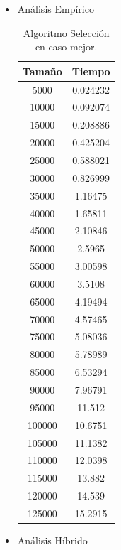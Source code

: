 \documentclass[a4paper,12pt,twoside]{article} %
\begin{document}
	\begin{itemize}
	\item Análisis Empírico
	
	\begin{table}[h]
	\begin{center}
		\begin{tabular}{|c|c|}
		\hline
		Tamaño & Tiempo \\
		\hline
		5000 & 0.024232 \\
		10000 & 0.092074 \\
		15000 & 0.208886 \\
		20000 & 0.425204 \\
		25000 & 0.588021 \\
		30000 & 0.826999 \\
		35000 & 1.16475 \\
		40000 & 1.65811 \\
		45000 & 2.10846 \\
		50000 & 2.5965 \\
		55000 & 3.00598 \\
		60000 & 3.5108 \\
		65000 & 4.19494 \\
		70000 & 4.57465 \\
		75000 & 5.08036 \\
		80000 & 5.78989 \\
		85000 & 6.53294 \\
		90000 & 7.96791 \\
		95000 & 11.512 \\
		100000 & 10.6751 \\
		105000 & 11.1382 \\
		110000 & 12.0398 \\
		115000 & 13.882 \\
		120000 & 14.539 \\
		125000 & 15.2915 \\

		\hline
		\end{tabular}
	\end{center}
	\caption{Algoritmo Selección en caso mejor.}
\end{table}
\newpage
	
	\item Análisis Híbrido
	
\begin{figure}[h]
  \begin{center}
  

\end{center}
\end{figure}
\end{itemize}
\end{document}
